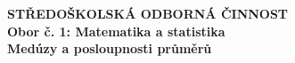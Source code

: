 \documentclass[12pt]{report}
\begin{document}
\begin{titlepage}
{
\centering
\LARGE \textbf{STŘEDOŠKOLSKÁ ODBORNÁ ČINNOST}\\
\Large\textbf{Obor č. 1: Matematika a statistika}\\
\vspace{6cm}
\LARGE\textbf{Medúzy a posloupnosti průměrů}\\
}
\vspace{1cm}
  \begin{center}
\end{center}
\end{titlepage}
\end{document}

